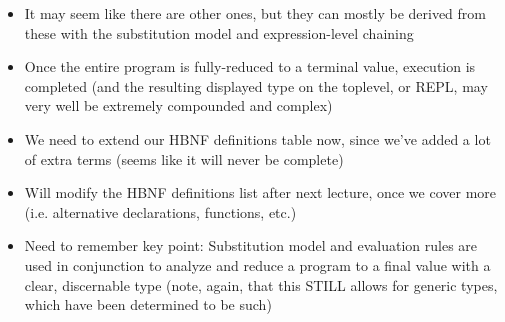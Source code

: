 \begin{itemize}
\begin{enumerate}
    \end{enumerate}
    \item It may seem like there are other ones, but they can mostly be derived from these with the substitution model and expression-level chaining
    \item Once the entire program is fully-reduced to a terminal value, execution is completed (and the resulting displayed type on the toplevel, or REPL, may very well be extremely compounded and complex)
    \item We need to extend our HBNF definitions table now, since we've added a lot of extra terms (seems like it will never be complete)
    \item Will modify the HBNF definitions list after next lecture, once we cover more (i.e. alternative declarations, functions, etc.)
    \item Need to remember key point: Substitution model and evaluation rules are used in conjunction to analyze and reduce a program to a final value with a clear, discernable type (note, again, that this STILL allows for generic types, which have been determined to be such)
\end{itemize}